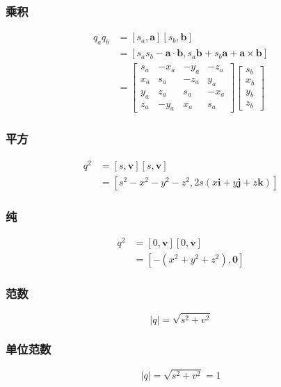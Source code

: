 \subsubsection*{乘积}
$$
\begin{aligned}
q_{a} q_{b} & =\left[s_{a}, \mathbf{a}\right]\left[s_{b}, \mathbf{b}\right] \\
& =\left[s_{a} s_{b}-\mathbf{a} \cdot \mathbf{b}, s_{a} \mathbf{b}+s_{b} \mathbf{a}+\mathbf{a} \times \mathbf{b}\right] \\
& =\left[\begin{array}{cccc}
s_{a} & -x_{a} & -y_{a} & -z_{a} \\
x_{a} & s_{a} & -z_{a} & y_{a} \\
y_{a} & z_{a} & s_{a} & -x_{a} \\
z_{a} & -y_{a} & x_{a} & s_{a}
\end{array}\right]\left[\begin{array}{c}
s_{b} \\
x_{b} \\
y_{b} \\
z_{b}
\end{array}\right]
\end{aligned}
$$

\subsubsection*{平方}
$$
\begin{aligned}
q^{2} & =[s, \mathbf{v}][s, \mathbf{v}] \\
& =\left[s^{2}-x^{2}-y^{2}-z^{2}, 2 s(x \mathbf{i}+y \mathbf{j}+z \mathbf{k})\right]
\end{aligned}
$$

\subsubsection*{纯}
$$
\begin{aligned}
q^{2} & =[0, \mathbf{v}][0, \mathbf{v}] \\
& =\left[-\left(x^{2}+y^{2}+z^{2}\right), \mathbf{0}\right]
\end{aligned}
$$

\subsubsection*{范数}
$$
|q|=\sqrt{s^{2}+v^{2}}
$$

\subsubsection*{单位范数}
$$
|q|=\sqrt{s^{2}+v^{2}}=1
$$


